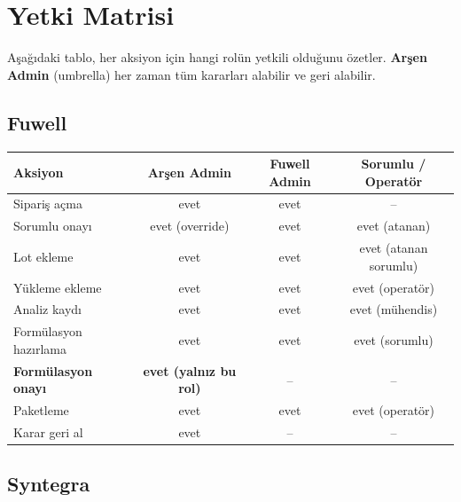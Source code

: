 \documentclass[11pt,a4paper]{article}
\begin{document}
\newpage

\section{Yetki Matrisi}

Aşağıdaki tablo, her aksiyon için hangi rolün yetkili olduğunu özetler.
\textbf{Arşen Admin} (umbrella) her zaman tüm kararları alabilir ve geri
alabilir.

\subsection{Fuwell}

\begin{tabularx}{\textwidth}{Xccc}
\toprule
\textbf{Aksiyon} & \textbf{Arşen Admin} & \textbf{Fuwell Admin} & \textbf{Sorumlu / Operatör} \\
\midrule
Sipariş açma & evet & evet & -- \\
Sorumlu onayı & evet (override) & evet & evet (atanan) \\
Lot ekleme & evet & evet & evet (atanan sorumlu) \\
Yükleme ekleme & evet & evet & evet (operatör) \\
Analiz kaydı & evet & evet & evet (mühendis) \\
Formülasyon hazırlama & evet & evet & evet (sorumlu) \\
\textbf{Formülasyon onayı} & \textbf{evet (yalnız bu rol)} & -- & -- \\
Paketleme & evet & evet & evet (operatör) \\
Karar geri al & evet & -- & -- \\
\bottomrule
\end{tabularx}

\vspace{1cm}

\subsection{Syntegra}
\end{document}
